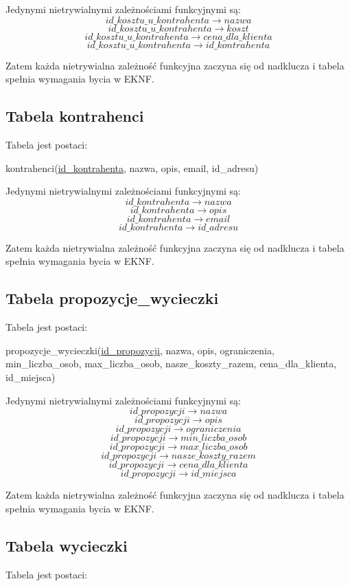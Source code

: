 \documentclass[a4paper,12pt]{mwart}
\begin{document}
\noindent Jedynymi nietrywialnymi zależnościami funkcyjnymi są:
$$   id\_kosztu\_u\_kontrahenta\rightarrow nazwa $$
$$   id\_kosztu\_u\_kontrahenta\rightarrow koszt $$
$$   id\_kosztu\_u\_kontrahenta\rightarrow cena\_dla\_klienta $$
$$   id\_kosztu\_u\_kontrahenta\rightarrow id\_kontrahenta $$


Zatem każda nietrywialna zależność funkcyjna zaczyna się od nadklucza i tabela  spełnia wymagania bycia w EKNF.


\subsection{Tabela kontrahenci}
Tabela jest postaci:

kontrahenci(\underline{id\_kontrahenta}, nazwa, opis, email, id\_adresu)

\noindent Jedynymi nietrywialnymi zależnościami funkcyjnymi są:
$$   id\_kontrahenta  \rightarrow nazwa $$
$$   id\_kontrahenta  \rightarrow opis $$
$$   id\_kontrahenta \rightarrow email $$
$$   id\_kontrahenta \rightarrow id\_adresu $$


Zatem każda nietrywialna zależność funkcyjna zaczyna się od nadklucza i tabela  spełnia wymagania bycia w EKNF.


\subsection{Tabela propozycje\_wycieczki}
Tabela jest postaci:

propozycje\_wycieczki(\underline{id\_propozycji}, nazwa, opis, ograniczenia, min\_liczba\_osob, max\_liczba\_osob, nasze\_koszty\_razem, cena\_dla\_klienta, id\_miejsca)

\noindent Jedynymi nietrywialnymi zależnościami funkcyjnymi są:
$$   id\_propozycji  \rightarrow nazwa $$
$$   id\_propozycji\rightarrow opis $$
$$   id\_propozycji\rightarrow ograniczenia $$
$$   id\_propozycji\rightarrow min\_liczba\_osob $$
$$   id\_propozycji\rightarrow max\_liczba\_osob $$
$$   id\_propozycji\rightarrow nasze\_koszty\_razem $$
$$   id\_propozycji\rightarrow cena\_dla\_klienta $$
$$   id\_propozycji\rightarrow id\_miejsca $$


Zatem każda nietrywialna zależność funkcyjna zaczyna się od nadklucza i tabela  spełnia wymagania bycia w EKNF.

\subsection{Tabela wycieczki}
Tabela jest postaci:
\end{document}
